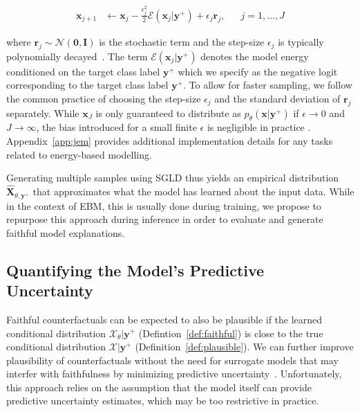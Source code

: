 \begin{equation}\label{eq:sgld}
  \begin{aligned}
    \mathbf{x}_{j+1} &\leftarrow \mathbf{x}_j - \frac{\epsilon_j^2}{2} \mathcal{E}(\mathbf{x}_j|\mathbf{y}^+) + \epsilon_j \mathbf{r}_j, && j=1,...,J
  \end{aligned}
\end{equation}

where $\mathbf{r}_j \sim \mathcal{N}(\mathbf{0},\mathbf{I})$ is the stochastic term and the step-size $\epsilon_j$ is typically polynomially decayed~\citep{welling2011bayesian}. The term $\mathcal{E}(\mathbf{x}_j|\mathbf{y}^+)$ denotes the model energy conditioned on the target class label $\mathbf{y}^+$ which we specify as the negative logit corresponding to the target class label $\mathbf{y}^{+}$. To allow for faster sampling, we follow the common practice of choosing the step-size $\epsilon_j$ and the standard deviation of $\mathbf{r}_j$ separately. While $\mathbf{x}_J$ is only guaranteed to distribute as $p_{\theta}(\mathbf{x}|\mathbf{y}^{+})$ if $\epsilon \rightarrow 0$ and $J \rightarrow \infty$, the bias introduced for a small finite $\epsilon$ is negligible in practice \citep{murphy2023probabilistic,grathwohl2020your}. Appendix~\ref{app:jem} provides additional implementation details for any tasks related to energy-based modelling. 

Generating multiple samples using SGLD thus yields an empirical distribution $\widehat{\mathbf{X}}_{\theta,\mathbf{y}^+}$ that approximates what the model has learned about the input data. While in the context of EBM, this is usually done during training, we propose to repurpose this approach during inference in order to evaluate and generate faithful model explanations.

\subsection{Quantifying the Model's Predictive Uncertainty}

Faithful counterfactuals can be expected to also be plausible if the learned conditional distribution $\mathcal{X}_{\theta}|\mathbf{y}^+$ (Defintion~\ref{def:faithful}) is close to the true conditional distribution $\mathcal{X}|\mathbf{y}^+$ (Definition~\ref{def:plausible}). We can further improve plausibility of counterfactuals without the need for surrogate models that may interfer with faithfulness by minimizing predictive uncertainty~\citep{schut2021generating}.
Unfortunately, this approach relies on the assumption that the model itself can provide predictive uncertainty estimates, which may be too restrictive in practice. 

